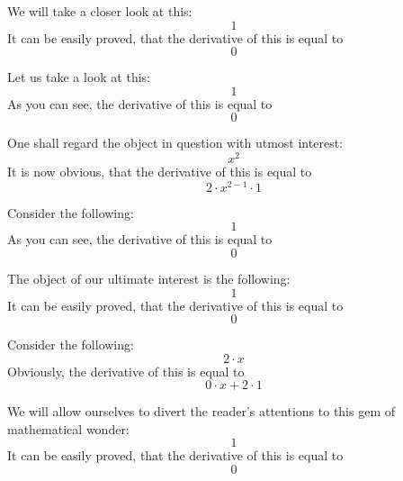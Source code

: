 \documentclass{article}
\begin{document}
We will take a closer look at this:
\begin{equation}
1 
\end{equation}
It can be easily proved, that the derivative of this is equal to
\begin{equation}
0 
\end{equation}

Let us take a look at this:
\begin{equation}
1 
\end{equation}
As you can see, the derivative of this is equal to
\begin{equation}
0 
\end{equation}

One shall regard the object in question with utmost interest:
\begin{equation}
x ^{2 } 
\end{equation}
It is now obvious, that the derivative of this is equal to
\begin{equation}
2 \cdot x ^{2 - 1 } \cdot 1 
\end{equation}

Consider the following:
\begin{equation}
1 
\end{equation}
As you can see, the derivative of this is equal to
\begin{equation}
0 
\end{equation}

The object of our ultimate interest is the following:
\begin{equation}
1 
\end{equation}
It can be easily proved, that the derivative of this is equal to
\begin{equation}
0 
\end{equation}

Consider the following:
\begin{equation}
2 \cdot x 
\end{equation}
Obviously, the derivative of this is equal to
\begin{equation}
0 \cdot x + 2 \cdot 1 
\end{equation}

We will allow ourselves to divert the reader's attentions to this gem of mathematical wonder:
\begin{equation}
1 
\end{equation}
It can be easily proved, that the derivative of this is equal to
\begin{equation}
0 
\end{equation}
\end{document}
